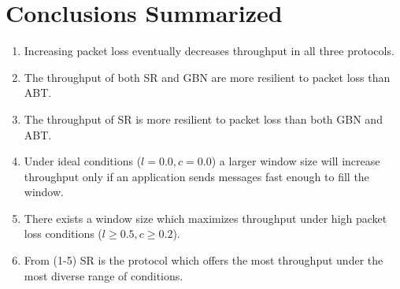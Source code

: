 \documentclass{article}
\begin{document}
\pagebreak

\section{Conclusions Summarized}
\begin{enumerate}
    \item Increasing packet loss eventually decreases throughput in all three protocols.
    \item The throughput of both SR and GBN are more resilient to packet loss than ABT.
    \item The throughput of SR is more resilient to packet loss than both GBN and ABT.
    \item Under ideal conditions ($l=0.0, c=0.0$) a larger window size will increase throughput only if an application sends messages fast enough to fill the window.
    \item There exists a window size which maximizes throughput under high packet loss conditions ($l\ge0.5, c\ge0.2$).
    \item From (1-5) SR is the protocol which offers the most throughput under the most diverse range of conditions.
\end{enumerate}
\end{document}
